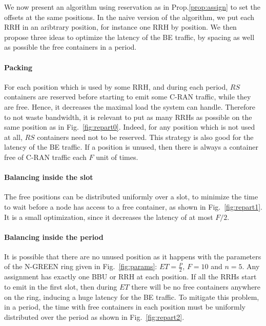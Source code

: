 \documentclass[]{llncs}
\begin{document}
We now present an algorithm using reservation as in Prop.\ref{prop:assign} to set the offsets at the same positions.
In the naive version of the algorithm, we put each RRH in an aribtrary position, for instance one RRH by position.
 We then propose three ideas to optimize the latency of the BE traffic, by spacing as well as possible the free containers in a period. 


\paragraph{Packing}

For each position which is used by some RRH, and during each period, $RS$ containers are reserved before starting to emit some C-RAN traffic, while they are free. Hence, it decreases the maximal load the system can handle.
Therefore to not waste bandwidth, it is relevant to put as many RRHs as possible on the same position as in Fig.~\ref{fig:repart0}. Indeed, for any position which is not used at all, $RS$ containers need not to be reserved. This strategy is also good for the latency of the BE traffic. If a position is unused, then there is always a container free of C-RAN traffic each $F$ unit of times. 

\paragraph{Balancing inside the slot}

The free positions can be distributed uniformly over a slot, to minimize the time to wait before a node 
has access to a free container, as shown in Fig.~\ref{fig:repart1}. It is a small optimization, since 
it decreases the latency of at most $F/2$.


\paragraph{Balancing inside the period}

It is possible that there are no unused position as it happens with the parameters of the N-GREEN ring given in Fig.~\ref{fig:params}: $ET = \frac{P}{2}$, $F = 10$ and $n = 5$. Any assignment has exactly one  BBU or RRH at each position. If all the RRHs start to emit in the first slot, then during $ET$ there will be no free containers anywhere on the ring, inducing a huge latency for the BE traffic. 
To mitigate this problem, in a period, the time with free containers in each position must be uniformly distributed over the period as shown in Fig.~\ref{fig:repart2}.
\end{document}
